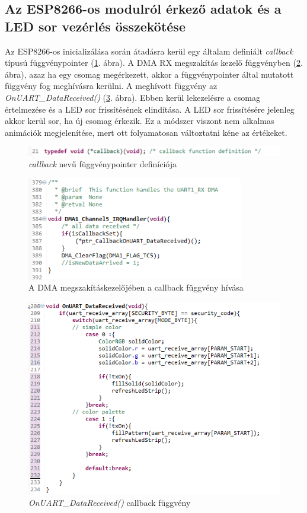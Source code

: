 \documentclass[../main.tex]{subfiles}
\begin{document}
    \subsection{Az ESP8266-os modulról érkező adatok és a LED sor vezérlés összekötése}
        Az ESP8266-os inicializálása során átadásra kerül egy általam definiált \textit{callback} típusú függvénypointer (\ref{fig:callback_typedef}. ábra). A DMA RX megszakítás kezelő függvényben (\ref{fig:callback_call}. ábra), azaz ha egy csomag megérkezett, akkor a függvénypointer által mutatott függvény fog meghívásra kerülni. A meghívott függvény az \textit{OnUART_DataReceived()} (\ref{fig:callback_function}. ábra). Ebben kerül lekezelésre a csomag értelmezése és a LED sor frissítésének elindítása. A LED sor frissítésére jelenleg akkor kerül sor, ha új csomag érkezik. Ez a módszer viszont nem alkalmas animációk megjelenítése, mert ott folyamatosan változtatni kéne az értékeket.
        
        \begin{figure}[h!]
            \centering
                \includegraphics[width=11.5cm]{mbed_res/callback_typedef}
            \caption{\textit{callback} nevű függvénypointer definíciója}
            \label{fig:callback_typedef}
        \end{figure}
        
        \begin{figure}[h!]
            \centering
                \includegraphics[width=9.5cm]{mbed_res/callback_dma.png}
            \caption{A DMA megszakításkezelőjében a callback függvény hívása}
            \label{fig:callback_call}
        \end{figure}
        
        \begin{figure}[h!]
            \centering
                \includegraphics[width=11.5cm]{mbed_res/callback_function}
            \caption{\textit{OnUART_DataReceived()} callback függvény}
            \label{fig:callback_function}
        \end{figure}

\newpage            
\end{document}
